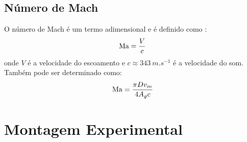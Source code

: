 \subsection{Número de Mach}

O número de Mach é um termo adimensional e é definido como \cite{cengel2015mecanica}:
%
\begin{equation}
    \text{Ma} = \frac{V}{c}
    \label{eq:mach}
\end{equation}
%
onde $V$ é a velocidade do escoamento e $c \approx \SI{343}{m.s^{-1}}$ é a velocidade do som. Também pode ser determinado como:
%
\begin{equation}
    \text{Ma} = \frac{\pi D v_m}{4 A_g c}
    \label{eq:mach_f}
\end{equation}

\section{Montagem Experimental}

